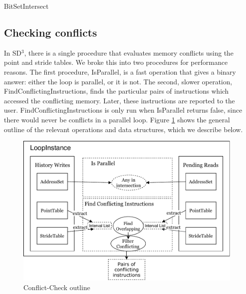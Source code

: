 \documentclass[12pt,twoside]{reedthesis}
\begin{document}
			\begin{algorithm}
				\caption{BitSetIntersect}
				\label{bitsetintersect}
				\begin{algorithmic}[1]
					\Else
					\EndIf
					\EndFor
					
					\EndFunction
				\end{algorithmic}
			\end{algorithm}
		
		\subsection{Checking conflicts}
			
			In SD$^3$, there is a single procedure that evaluates memory conflicts using the point and stride tables. We broke this into two procedures for performance reasons.  The first procedure, IsParallel, is a fast operation that gives a binary answer: either the loop is parallel, or it is not. The second, slower operation, FindConflictingInstructions, finds the particular pairs of instructions which accessed the conflicting memory. Later, these instructions are reported to the user. FindConflictingInstructions is only run when IsParallel returns false, since there would never be conflicts in a parallel loop. Figure \ref{fig:conflict-check} shows the general outline of the relevant operations and data structures, which we describe below. 
			
			\begin{figure}
				\caption{Conflict-Check outline}
				\label{fig:conflict-check}
				\includegraphics[scale=1.0]{conflict-diagram-output.pdf}
			\end{figure}
		
\end{document}
